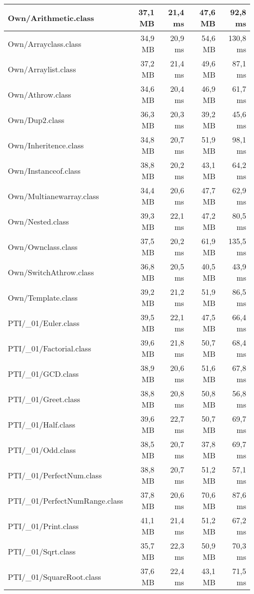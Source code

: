 \begin{center}
\begin{longtable}{ | l | r | r | r | r | }
		Own/Arithmetic.class & 37,1 MB & 21,4 ms & 47,6 MB & 92,8 ms \\
		\hline
		Own/Arrayclass.class & 34,9 MB & 20,9 ms & 54,6 MB & 130,8 ms \\
		\hline
		Own/Arraylist.class & 37,2 MB & 21,4 ms & 49,6 MB & 87,1 ms \\
		\hline
		Own/Athrow.class & 34,6 MB & 20,4 ms & 46,9 MB & 61,7 ms \\
		\hline
		Own/Dup2.class & 36,3 MB & 20,3 ms & 39,2 MB & 45,6 ms \\
		\hline
		Own/Inheritence.class & 34,8 MB & 20,7 ms & 51,9 MB & 98,1 ms \\
		\hline
		Own/Instanceof.class & 38,8 MB & 20,2 ms & 43,1 MB & 64,2 ms \\
		\hline
		Own/Multianewarray.class & 34,4 MB & 20,6 ms & 47,7 MB & 62,9 ms \\
		\hline
		Own/Nested.class & 39,3 MB & 22,1 ms & 47,2 MB & 80,5 ms \\
		\hline
		Own/Ownclass.class & 37,5 MB & 20,2 ms & 61,9 MB & 135,5 ms \\
		\hline
		Own/SwitchAthrow.class & 36,8 MB & 20,5 ms & 40,5 MB & 43,9 ms \\
		\hline
		Own/Template.class & 39,2 MB & 21,2 ms & 51,9 MB & 86,5 ms \\
		\hline
		PTI/\_01/Euler.class & 39,5 MB & 22,1 ms & 47,5 MB & 66,4 ms \\
		\hline
		PTI/\_01/Factorial.class & 39,6 MB & 21,8 ms & 50,7 MB & 68,4 ms \\
		\hline
		PTI/\_01/GCD.class & 38,9 MB & 20,6 ms & 51,6 MB & 67,8 ms \\
		\hline
		PTI/\_01/Greet.class & 38,8 MB & 20,8 ms & 50,8 MB & 56,8 ms \\
		\hline
		PTI/\_01/Half.class & 39,6 MB & 22,7 ms & 50,7 MB & 69,7 ms \\
		\hline
		PTI/\_01/Odd.class & 38,5 MB & 20,7 ms & 37,8 MB & 69,7 ms \\
		\hline
		PTI/\_01/PerfectNum.class & 38,8 MB & 20,7 ms & 51,2 MB & 57,1 ms \\
		\hline
		PTI/\_01/PerfectNumRange.class & 37,8 MB & 20,6 ms & 70,6 MB & 87,6 ms \\
		\hline
		PTI/\_01/Print.class & 41,1 MB & 21,4 ms & 51,2 MB & 67,2 ms \\
		\hline
		PTI/\_01/Sqrt.class & 35,7 MB & 22,3 ms & 50,9 MB & 70,3 ms \\
		\hline
		PTI/\_01/SquareRoot.class & 37,6 MB & 22,4 ms & 43,1 MB & 71,5 ms \\

\end{longtable}
\end{center}
